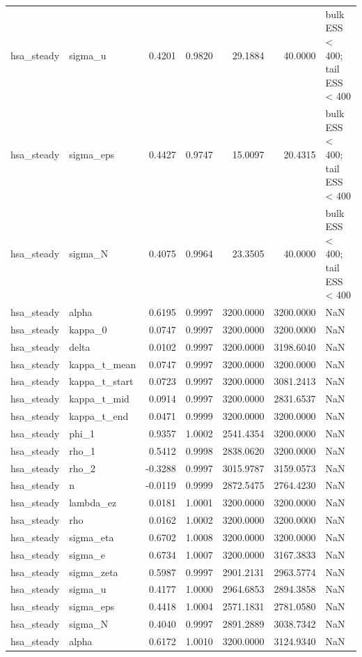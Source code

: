 \begin{tabular}{llrrrrl}
hsa\_steady & sigma\_u & 0.4201 & 0.9820 & 29.1884 & 40.0000 & bulk ESS < 400; tail ESS < 400 \\
hsa\_steady & sigma\_eps & 0.4427 & 0.9747 & 15.0097 & 20.4315 & bulk ESS < 400; tail ESS < 400 \\
hsa\_steady & sigma\_N & 0.4075 & 0.9964 & 23.3505 & 40.0000 & bulk ESS < 400; tail ESS < 400 \\
hsa\_steady & alpha & 0.6195 & 0.9997 & 3200.0000 & 3200.0000 & NaN \\
hsa\_steady & kappa\_0 & 0.0747 & 0.9997 & 3200.0000 & 3200.0000 & NaN \\
hsa\_steady & delta & 0.0102 & 0.9997 & 3200.0000 & 3198.6040 & NaN \\
hsa\_steady & kappa\_t\_mean & 0.0747 & 0.9997 & 3200.0000 & 3200.0000 & NaN \\
hsa\_steady & kappa\_t\_start & 0.0723 & 0.9997 & 3200.0000 & 3081.2413 & NaN \\
hsa\_steady & kappa\_t\_mid & 0.0914 & 0.9997 & 3200.0000 & 2831.6537 & NaN \\
hsa\_steady & kappa\_t\_end & 0.0471 & 0.9999 & 3200.0000 & 3200.0000 & NaN \\
hsa\_steady & phi\_1 & 0.9357 & 1.0002 & 2541.4354 & 3200.0000 & NaN \\
hsa\_steady & rho\_1 & 0.5412 & 0.9998 & 2838.0620 & 3200.0000 & NaN \\
hsa\_steady & rho\_2 & -0.3288 & 0.9997 & 3015.9787 & 3159.0573 & NaN \\
hsa\_steady & n & -0.0119 & 0.9999 & 2872.5475 & 2764.4230 & NaN \\
hsa\_steady & lambda\_ez & 0.0181 & 1.0001 & 3200.0000 & 3200.0000 & NaN \\
hsa\_steady & rho & 0.0162 & 1.0002 & 3200.0000 & 3200.0000 & NaN \\
hsa\_steady & sigma\_eta & 0.6702 & 1.0008 & 3200.0000 & 3200.0000 & NaN \\
hsa\_steady & sigma\_e & 0.6734 & 1.0007 & 3200.0000 & 3167.3833 & NaN \\
hsa\_steady & sigma\_zeta & 0.5987 & 0.9997 & 2901.2131 & 2963.5774 & NaN \\
hsa\_steady & sigma\_u & 0.4177 & 1.0000 & 2964.6853 & 2894.3858 & NaN \\
hsa\_steady & sigma\_eps & 0.4418 & 1.0004 & 2571.1831 & 2781.0580 & NaN \\
hsa\_steady & sigma\_N & 0.4040 & 0.9997 & 2891.2889 & 3038.7342 & NaN \\
hsa\_steady & alpha & 0.6172 & 1.0010 & 3200.0000 & 3124.9340 & NaN \\

\end{tabular}
